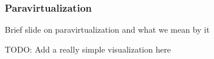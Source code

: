 \begin{frame}
\frametitle{Paravirtualization}

Brief slide on paravirtualization and what we mean by it

TODO: Add a really simple visualization here

\end{frame}
